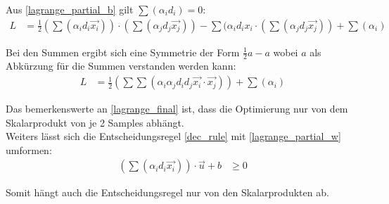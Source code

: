 \documentclass[a4paper,11pt,twoside]{scrreprt}
\begin{document}
Aus \autoref{lagrange_partial_b} gilt $\sum (\alpha_{i} d_{i}) = 0$:
\begin{equation} \label{lagrange_3}
    \begin{aligned}
    L &= \frac{1}{2} (\sum (\alpha_{i} d_{i} \vec{x_{i}})) \cdot (\sum (\alpha_{j} d_{j} \vec{x_{j}})) - \sum (\alpha_{i} d_{i} x_{i} \cdot (\sum (\alpha_{j} d_{j} \vec{x_{j}})) + \sum (\alpha_{i})
    \end{aligned}
\end{equation}

Bei den Summen ergibt sich eine Symmetrie der Form $\frac{1}{2} a - a$ wobei $a$ als Abkürzung für die Summen verstanden werden kann:
\begin{equation} \label{lagrange_final}
    \begin{aligned}
    L &= \frac{1}{2} (\sum \sum (\alpha_{i} \alpha_{j} d_{i} d_{j} \vec{x_{i}} \cdot \vec{x_{j}})) + \sum (\alpha_{i})
    \end{aligned}
\end{equation}

Das bemerkenswerte an \autoref{lagrange_final} ist, dass die Optimierung nur von dem Skalarprodukt von je 2 Samples abhängt. \\

Weiters lässt sich die Entscheidungsregel \autoref{dec_rule} mit \autoref{lagrange_partial_w} umformen:
\begin{equation} \label{dec_rule}
    \begin{aligned}
    (\sum (\alpha_{i} d_{i} \vec{x_{i}})) \cdot \vec{u} + b & \geq 0 
    \end{aligned}
\end{equation}

Somit hängt auch die Entscheidungsregel nur von den Skalarprodukten ab.



\clearpage
{}
{}
\printbibliography
\end{document}
